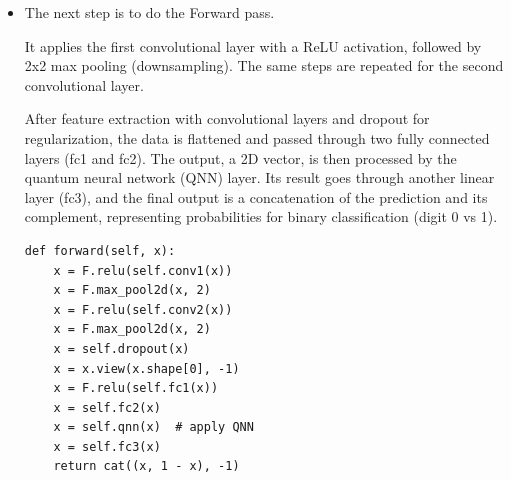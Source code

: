 \documentclass[conference]{IEEEtran}
\begin{document}
\begin{itemize}
        The Qiskit quantum neural network is then wrapped using the TorchConnector, allowing it to be used as a layer in the PyTorch model. The QNN takes the 2-dimensional input from fc2 and produces a 1-dimensional output.\\

        The parameters (weights) of the quantum circuit are initialized randomly in the interval $[-1,1]$.
        
        Finally, fc3 is another fully connected layer that takes the 1-dimensional output from the QNN and produces a final output of 2 features (which can be interpreted as probabilities for binary classification).\\

        


{\small
\begin{verbatim}
class Net(Module):
def __init__(self, qnn):
    super().__init__()
    self.conv1 = 
    Conv2d(1, 2, kernel_size=5)
    self.conv2 = 
    Conv2d(2, 16, kernel_size=5)
    self.dropout = 
    Dropout2d()
    self.fc1 = 
    Linear(256, 64)
    self.fc2 = 
    Linear(64, 2) 
    self.qnn 
    = TorchConnector(qnn) 
    self.fc3 = Linear(1, 1)  
\end{verbatim}
}

        \item The next step is to do the Forward pass.
        
        It applies the first convolutional layer with a ReLU \cite{pytorch_relu} activation, followed by 2x2 max pooling (downsampling). The same steps are repeated for the second convolutional layer.

        After feature extraction with convolutional layers and dropout for regularization, the data is flattened and passed through two fully connected layers (fc1 and fc2). The output, a 2D vector, is then processed by the quantum neural network (QNN) layer. Its result goes through another linear layer (fc3), and the final output is a concatenation of the prediction and its complement, representing probabilities for binary classification (digit 0 vs 1).


{\small
\begin{verbatim}
def forward(self, x):
    x = F.relu(self.conv1(x))
    x = F.max_pool2d(x, 2)
    x = F.relu(self.conv2(x))
    x = F.max_pool2d(x, 2)
    x = self.dropout(x)
    x = x.view(x.shape[0], -1)
    x = F.relu(self.fc1(x))
    x = self.fc2(x)
    x = self.qnn(x)  # apply QNN
    x = self.fc3(x)
    return cat((x, 1 - x), -1)
\end{verbatim}}



\end{itemize}
\end{document}
